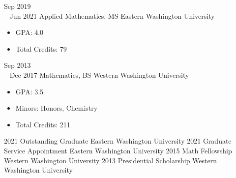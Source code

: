 \documentclass[11pt]{developercv} %
\newcommand{\vsp}{\vspace{-10pt}}
\begin{document}
\begin{entrylist}
	\entry
		{Sep 2019\\
		-- Jun 2021}
		{Applied Mathematics, MS}
		{Eastern Washington University}
		{\vspace{-0.5cm}\begin{itemize}
			\item GPA: 4.0
			\item Total Credits: 79
		\end{itemize}}
	\entry
		{Sep 2013\\
		-- Dec 2017}
		{Mathematics, BS}
		{Western Washington University}
		{\vspace{-0.5cm}\begin{itemize}
			\item GPA: 3.5
			\item Minors: Honors, Chemistry
			\item Total Credits: 211
		\end{itemize}}
\end{entrylist}
\vsp

\begin{entrylist}
	\vspace{-0.5cm}
	\entry
		{2021}
		{Outstanding Graduate}
		{Eastern Washington University}
		{}
	\vspace{-0.5cm}
	\entry
		{2021}
		{Graduate Service Appointment}
		{Eastern Washington University}
		{}
	\vspace{-0.5cm}
	\entry
		{2015}
		{Math Fellowship}
		{Western Washington University}
		{}
	\entry
		{2013}
		{Presidential Scholarship}
		{Western Washington University}
		{}
\end{entrylist}
\vsp

\pagebreak
\end{document}

